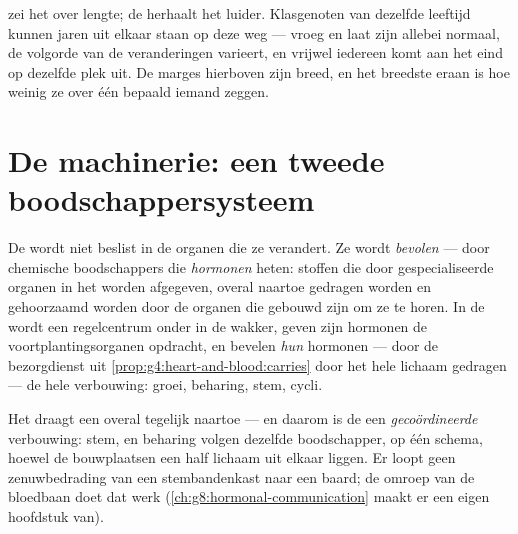 \begin{remark}\label{rem:g8:puberty:timetable}
 zei het over lengte; de  herhaalt
het luider. Klasgenoten van dezelfde leeftijd kunnen jaren uit elkaar
staan op deze weg --- vroeg en laat zijn allebei normaal, de volgorde van
de veranderingen varieert, en vrijwel iedereen komt aan het eind op
dezelfde plek uit. De marges hierboven zijn breed, en het breedste eraan
is hoe weinig ze over één bepaald iemand zeggen.
\end{remark}

\section{De machinerie: een tweede boodschappersysteem}

\begin{definition}\label{def:g8:puberty:hormones}
De  wordt niet beslist in de organen die ze verandert. Ze wordt
\emph{bevolen} --- door chemische boodschappers die
\emph{hormonen} heten: stoffen die door gespecialiseerde
organen in het \emph{} worden afgegeven, overal naartoe gedragen
worden en gehoorzaamd worden door de organen die gebouwd zijn om ze te
horen. In de  wordt een regelcentrum onder in de  wakker,
geven zijn hormonen de voortplantingsorganen opdracht, en bevelen
\emph{hun} hormonen --- door de bezorgdienst uit
\cref{prop:g4:heart-and-blood:carries} door het hele lichaam gedragen ---
de hele verbouwing: groei, beharing, stem, cycli.
\end{definition}

\begin{example}\label{ex:g8:puberty:sites}
Het  draagt een  overal tegelijk naartoe --- en daarom is de
 een \emph{gecoördineerde} verbouwing: stem,  en
beharing volgen dezelfde boodschapper, op één schema, hoewel de
bouwplaatsen een half lichaam uit elkaar liggen. Er loopt geen
zenuwbedrading van een stembandenkast naar een baard; de omroep van de
bloedbaan doet dat werk
(\cref{ch:g8:hormonal-communication} maakt er een eigen hoofdstuk van).
\end{example}

